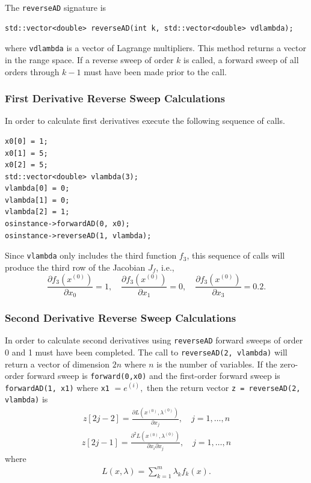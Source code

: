 \documentclass[11pt]{article}
\newcommand{\D}[2]{ \frac{\partial #1}{\partial #2} }
\newcommand{\DD}[3]{ \frac{\partial^2 #1}{\partial #2 \partial #3} }
\renewcommand{\_}{{\char"5F}}
\renewcommand{\{}{{\char"7B}}
\renewcommand{\}}{{\char"7D}}
\renewcommand{\^}{{\char"0D}}
\renewcommand{\'}{{\char"0D}}
\begin{document}
\begin{enumerate}[Step 1:]
The {\tt reverseAD} signature is
\begin{verbatim}
std::vector<double> reverseAD(int k, std::vector<double> vdlambda);
\end{verbatim}
where {\tt vdlambda} is a vector of Lagrange multipliers.  This method returns a vector in the range space. If a reverse sweep of order $k$ is called, a forward sweep of all orders  through  $k -1$ must have been made prior to the call.

\subsubsection{First Derivative Reverse Sweep Calculations}

In order to calculate first derivatives execute the following sequence of calls.
\begin{verbatim}
x0[0] = 1;
x0[1] = 5;
x0[2] = 5;
std::vector<double> vlambda(3);
vlambda[0] = 0;
vlambda[1] = 0;
vlambda[2] = 1;
osinstance->forwardAD(0, x0);
osinstance->reverseAD(1, vlambda);
\end{verbatim}
Since {\tt vlambda} only includes
the third function $f_3$, this sequence of calls will produce the third row of the
Jacobian $J_f$, i.e.,
$$
\D{f_{3}(x^{(0)})}{x_{0}}  = 1,  \quad \D{f_{3}(x^{(0)})}{x_{1}}  = 0, \quad  \D{f_{3}(x^{(0)})}{x_{3}}  = 0.2.
$$

\subsubsection{Second Derivative Reverse Sweep Calculations}

In order to calculate second derivatives using {\tt reverseAD} forward sweeps of order 0 and 1 must have been completed.  The call to {\tt reverseAD(2, vlambda)} will return a vector of dimension $2n$ where $n$ is the number of variables.  If the zero-order forward sweep is {\tt forward(0,x0)} and the first-order forward sweep is {\tt forwardAD(1, x1)} where {\tt x1} $= e^{(i)},$ then the return vector {\tt z = reverseAD(2,  vlambda)} is
\begin{eqnarray}
z[2j - 2]  = \D{L (x^{(0)}, \lambda^{(0)})}{x_{j}}, \quad j = 1, \ldots, n
\end{eqnarray}
\begin{eqnarray}
z[2j - 1]  = \DD{L(x^{(0)}, \lambda^{(0)})}{x_{i}}{x_{j}}, \quad j = 1, \ldots, n
\end{eqnarray}
where
\begin{eqnarray}
L (x, \lambda) = \sum_{k = 1}^{m} \lambda_{k} f_{k}(x).
\end{eqnarray}




\end{enumerate}
\end{document}

